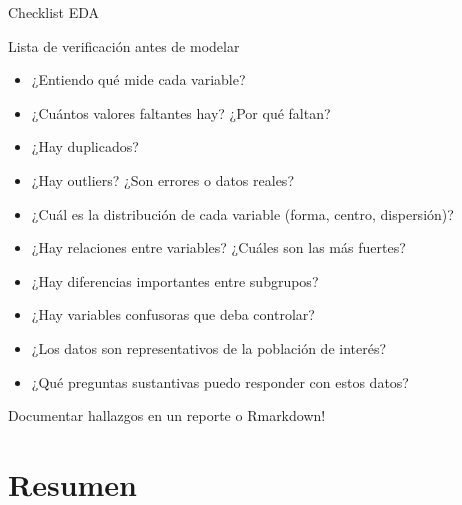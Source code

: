 \documentclass[aspectratio=169, 11pt]{beamer}
\begin{document}
\begin{frame}{Checklist EDA}
\begin{alertblock}{Lista de verificación antes de modelar}
\begin{itemize}
\item[$\square$] ¿Entiendo qué mide cada variable?
\item[$\square$] ¿Cuántos valores faltantes hay? ¿Por qué faltan?
\item[$\square$] ¿Hay duplicados?
\item[$\square$] ¿Hay outliers? ¿Son errores o datos reales?
\item[$\square$] ¿Cuál es la distribución de cada variable (forma, centro, dispersión)?
\item[$\square$] ¿Hay relaciones entre variables? ¿Cuáles son las más fuertes?
\item[$\square$] ¿Hay diferencias importantes entre subgrupos?
\item[$\square$] ¿Hay variables confusoras que deba controlar?
\item[$\square$] ¿Los datos son representativos de la población de interés?
\item[$\square$] ¿Qué preguntas sustantivas puedo responder con estos datos?
\end{itemize}
\end{alertblock}

\vspace{0.5em}
\alert{Documentar hallazgos en un reporte o Rmarkdown!}
\end{frame}

\section{Resumen}
\end{document}
